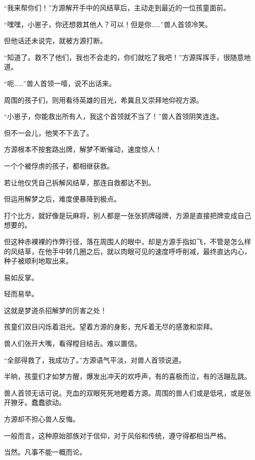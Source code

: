 
\begin{this_body}



“我来帮你们！”方源解开手中的风结草后，主动走到最近的一位孩童面前。

“嘿嘿，小崽子，你还想救其他人？可以！但是你……”兽人首领冷笑。

但他话还未说完，就被方源打断。

“知道了。救不了他们，我也不会走的，你们就吃了我吧！”方源挥挥手，很随意地道。

“呃……”兽人首领一噎，说不出话来。

周围的孩子们，则用看待英雄的目光，希冀且又崇拜地仰视方源。

“小崽子，你能救出所有人，我这个首领就不当了！”兽人首领阴笑连连。

但不一会儿，他笑不下去了。

方源根本不按套路出牌，解梦不断催动，速度惊人！

一个个被俘虏的孩子，都相继获救。

若让他仅凭自己拆解风结草，那连自救都达不到。

但运用解梦之后，难度便暴降到极点。

打个比方，就好像是玩麻将，别人都是一张张抓牌碰牌，方源是直接把牌变成自己想要的。

但这种赤裸裸的作弊行径，落在周围人的眼中，却是方源手指如飞，不管是怎么样的风结草，在他手中转几圈之后，就以肉眼可见的速度呼呼削减，最终直达内心，种子被顺利地取出来。

易如反掌。

轻而易举。

这就是梦道杀招解梦的厉害之处！

孩童们双目闪烁着泪光。望着方源的身影，充斥着无尽的感激和崇拜。

兽人们张开大嘴，看得瞠目结舌。难以置信。

“全部得救了，我成功了。”方源语气平淡，对兽人首领说道。

半晌，孩童们才如梦方醒，爆发出冲天的欢呼声，有的喜极而泣，有的活蹦乱跳。

兽人首领无话可说。充血的双眼死死地瞪着方源。周围的兽人们或是低吼，或是张开獠牙。蠢蠢欲动。

方源却不担心兽人反悔。

一般而言，这种原始部族对于信仰，对于风俗和传统，遵守得都相当严格。

当然。凡事不能一概而论。


\end{this_body}
